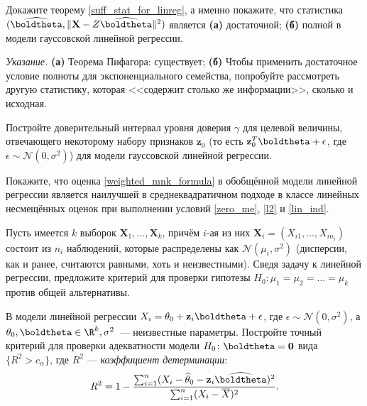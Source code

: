\begin{problem}\label{full_suff_stat_for_linreg}
    Докажите теорему \ref{suff_stat_for_linreg}, а именно покажите, что статистика $(\widehat{\boldtheta}, \|\mathbf X - Z \widehat{\boldtheta}\|^2)$ является \textbf{(а)} достаточной; \textbf{(б)} полной в модели гауссовской линейной регрессии.

    \textit{Указание.} \textbf{(а)} Теорема Пифагора: существует; \textbf{(б)} Чтобы применить достаточное условие полноты для экспоненциального семейства, попробуйте рассмотреть другую статистику, которая <<содержит столько же информации>>, сколько и исходная.
\end{problem}

\begin{problem}
    Постройте доверительный интервал уровня доверия $\gamma$ для целевой величины, отвечающего некоторому набору признаков $\mathbf z_0$ (то есть $\mathbf z_0^T\boldtheta + \epsilon$, где $\epsilon \sim \mathcal{N}(0, \sigma^2)$) для модели гауссовской линейной регрессии.
\end{problem}

\begin{problem}
    Покажите, что оценка \eqref{weighted_mnk_formula} в обобщённой модели линейной регрессии является наилучшей в среднеквадратичном подходе в классе линейных несмещённых оценок при выполнении условий \ref{zero_me}, \ref{l2} и \ref{lin_ind}.
\end{problem}

\begin{problem}\label{oneway_ANOVA}
	Пусть имеется $k$ выборок $\mathbf{X}_{1}, \ldots, \mathbf{X}_k$, причём $i$-ая из них $\mathbf{X}_{i} = (X_{i1}, \ldots, X_{i n_i})$ состоит из $n_i$ наблюдений, которые распределены как $\mathcal{N}(\mu_i, \sigma^2)$ (дисперсии, как и ранее, считаются равными, хоть и неизвестными). Сведя задачу к линейной регрессии, предложите критерий для проверки гипотезы $H_0\colon \mu_1 = \mu_2 = \ldots = \mu_k$ против общей альтернативы.
\end{problem}

\begin{problem}
	В модели линейной регрессии $X_i = \theta_0 + \mathbf{z}_i \boldtheta + \epsilon$, где $\epsilon \sim \mathcal{N}(0, \sigma^2)$, а $\theta_0, \boldtheta \in \R^k, \sigma^2$~--- неизвестные параметры. Постройте точный критерий для проверки адекватности модели $H_0\colon \boldtheta = \mathbf{0}$ вида $\{R^2 > c_{\alpha}\}$, где $R^2$ --- \textit{коэффициент детерминации}:
\[
R^2 = 1 - \frac{\sum_{i=1}^n (X_i - \widehat\theta_0 - \mathbf{z}_i\widehat\boldtheta)^2}{\sum_{i=1}^n (X_i - \overline{X})^2}.
\]
\end{problem}
